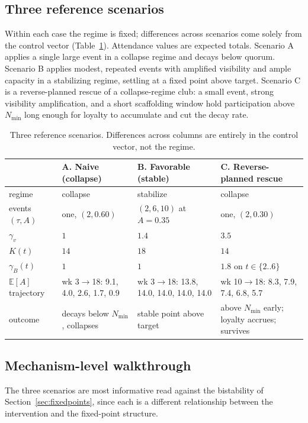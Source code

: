 \documentclass[11pt]{article}
\begin{document}
\subsection{Three reference scenarios}\label{sec:scenarios}
Within each case the regime is fixed; differences across scenarios come solely from the control vector (Table~\ref{tab:scenarios}). Attendance values are expected totals. Scenario A applies a single large event in a collapse regime and decays below quorum. Scenario B applies modest, repeated events with amplified visibility and ample capacity in a stabilizing regime, settling at a fixed point above target. Scenario C is a reverse-planned rescue of a collapse-regime club: a small event, strong visibility amplification, and a short scaffolding window hold participation above $N_{\min}$ long enough for loyalty to accumulate and cut the decay rate.

\begin{table}[t]
\centering\small
\setlength{\tabcolsep}{6pt}
\renewcommand{\arraystretch}{1.15}
\begin{tabular}{@{}lp{3.4cm}p{3.4cm}p{3.6cm}@{}}
\toprule
 & A. Naive (collapse) & B. Favorable (stable) & C. Reverse-planned rescue\\
\midrule
regime & collapse & stabilize & collapse\\
events $(\tau,A)$ & one, $(2,0.60)$ & $(2,6,10)$ at $A=0.35$ & one, $(2,0.30)$\\
$\gamma_v$ & $1$ & $1.4$ & $3.5$\\
$K(t)$ & $14$ & $18$ & $14$\\
$\gamma_B(t)$ & $1$ & $1$ & $1.8$ on $t\in\{2..6\}$\\
$\mathbb{E}[A]$ trajectory & wk 3$\to$18: 9.1, 4.0, 2.6, 1.7, 0.9 & wk 3$\to$18: 13.8, 14.0, 14.0, 14.0, 14.0 & wk 10$\to$18: 8.3, 7.9, 7.4, 6.8, 5.7\\
outcome & decays below $N_{\min}$, collapses & stable point above target & above $N_{\min}$ early; loyalty accrues; survives\\
\bottomrule
\end{tabular}
\caption{Three reference scenarios. Differences across columns are entirely in the control vector, not the regime.}
\label{tab:scenarios}
\end{table}

\subsection{Mechanism-level walkthrough}\label{sec:walkthrough}
The three scenarios are most informative read against the bistability of Section~\ref{sec:fixedpoints}, since each is a different relationship between the intervention and the fixed-point structure.
\end{document}
